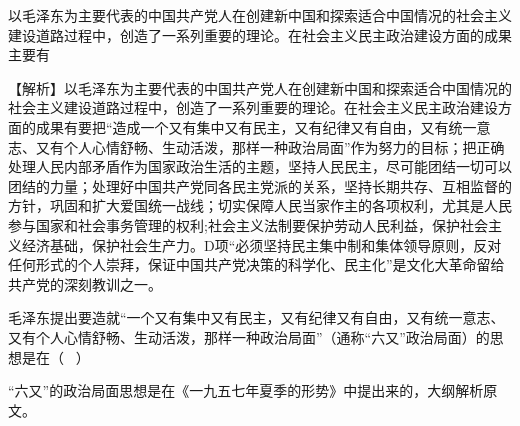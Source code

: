 \question 以毛泽东为主要代表的中国共产党人在创建新中国和探索适合中国情况的社会主义建设道路过程中，创造了一系列重要的理论。在社会主义民主政治建设方面的成果主要有
\par{}
\begin{solution}【解析】以毛泽东为主要代表的中国共产党人在创建新中国和探索适合中国情况的社会主义建设道路过程中，创造了一系列重要的理论。在社会主义民主政治建设方面的成果有要把``造成一个又有集中又有民主，又有纪律又有自由，又有统一意志、又有个人心情舒畅、生动活泼，那样一种政治局面''作为努力的目标；把正确处理人民内部矛盾作为国家政治生活的主题，坚持人民民主，尽可能团结一切可以团结的力量；处理好中国共产党同各民主党派的关系，坚持长期共存、互相监督的方针，巩固和扩大爱国统一战线；切实保障人民当家作主的各项权利，尤其是人民参与国家和社会事务管理的权利;社会主义法制要保护劳动人民利益，保护社会主义经济基础，保护社会生产力。D项``必须坚持民主集中制和集体领导原则，反对任何形式的个人崇拜，保证中国共产党决策的科学化、民主化''是文化大革命留给共产党的深刻教训之一。
\end{solution}
\question 毛泽东提出要造就``一个又有集中又有民主，又有纪律又有自由，又有统一意志、又有个人心情舒畅、生动活泼，那样一种政治局面''（通称``六又''政治局面）的思想是在（
~）
\par{}
\begin{solution}``六又''的政治局面思想是在《一九五七年夏季的形势》中提出来的，大纲解析原文。
\end{solution}
